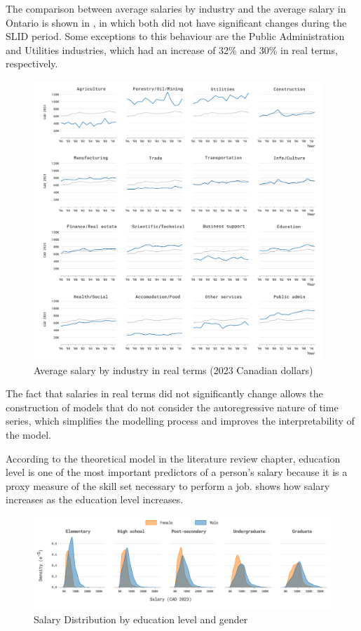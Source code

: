 The comparison between average salaries by industry and the average salary in Ontario is shown in , in which both did not have significant changes during the SLID period. Some exceptions to this behaviour are the Public Administration and Utilities industries, which had an increase of 32\% and 30\% in real terms, respectively.

\begin{figure}[H]
    \centering
    \includegraphics[width=0.97\textwidth]{images/ch4_avg_salary/avg_salary.png}
    \setlength{\abovecaptionskip}{-15pt}
    \caption{Average salary by industry in real terms (2023 Canadian dollars)}
    \label{fig:real_salary_industry}
\end{figure}

The fact that salaries in real terms did not significantly change allows the construction of models that do not consider the autoregressive nature of time series, which simplifies the modelling process and improves the interpretability of the model. 

According to the theoretical model in the literature review chapter, education level is one of the most important predictors of a person's salary because it is a proxy measure of the skill set necessary to perform a job.  shows how salary increases as the education level increases.

\begin{figure}[H]
    \centering
    \includegraphics[width=1.0\textwidth]{images/ch4_salary_edu_gender/salary_edu_gender.png}
    \caption{Salary Distribution by education level and gender}
    \label{fig:salary_education}
\end{figure}

